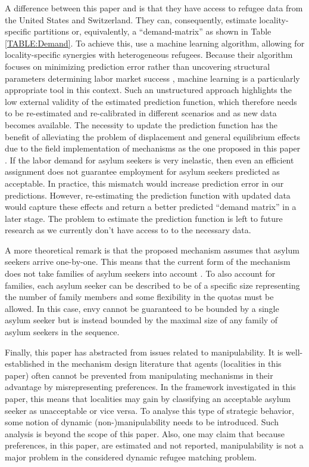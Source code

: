 \documentclass[12pt,fleqn]{article}
\begin{document}
A difference between this paper and \cite{bib:BansakEtAl} is that they have access to refugee data from the United States and Switzerland. They can, consequently, estimate locality-specific partitions or, equivalently, a ``demand-matrix'' as shown in Table \ref{TABLE:Demand}. To achieve this, \cite{bib:BansakEtAl} use a machine learning algorithm, allowing for locality-specific synergies with heterogeneous refugees. Because their algorithm focuses on minimizing prediction error rather than uncovering structural parameters determining labor market success \citep{bib:MullainathanSpiess}, machine learning is a particularly appropriate tool in this context. Such an unstructured approach highlights the low external validity of the estimated prediction function, which therefore needs to be re-estimated and re-calibrated in different scenarios and as new data becomes available. The necessity to update the prediction function has the benefit of alleviating the problem of displacement and general equilibrium effects due to the field implementation of mechanisms as the one proposed in this paper \citep{bib:CreponEtAl}. If the labor demand for asylum seekers is very inelastic, then even an efficient assignment does not guarantee employment for asylum seekers predicted as acceptable. In practice, this mismatch would increase prediction error in our predictions. However, re-estimating the prediction function with updated data would capture these effects and return a better predicted ``demand matrix'' in a later stage. The problem to estimate the prediction function is left to future research as we currently don't have access to to the necessary data.

A more theoretical remark is that the proposed mechanism assumes that asylum seekers arrive one-by-one. This means that the current form of the mechanism does not take families of asylum seekers into account \citep[see, e.g.,][for a mechanism that keeps families intact in house allocation problems with asylum seekers]{bib:AnderssonEhlers}. To also account for families, each asylum seeker can be described to be of a specific size representing the number of family members and some flexibility in the quotas must be allowed. In this case, envy cannot be guaranteed to be bounded by a single asylum seeker but is instead bounded by the maximal size of any family of asylum seekers in the sequence.

Finally, this paper has abstracted from issues related to manipulability. It is  well-established in the mechanism design literature that agents (localities in this paper) often cannot be prevented from manipulating mechanisms in their advantage by misrepresenting preferences. In the framework investigated in this paper, this means that localities may gain by classifying an acceptable asylum seeker as unacceptable or vice versa. To analyse this type of strategic behavior, some notion of dynamic (non-)manipulability needs to be introduced. Such analysis is beyond the scope of this paper. Also, one may claim that because preferences, in this paper, are estimated and not reported, manipulability is not a major problem in the considered dynamic refugee matching problem.
\end{document}
